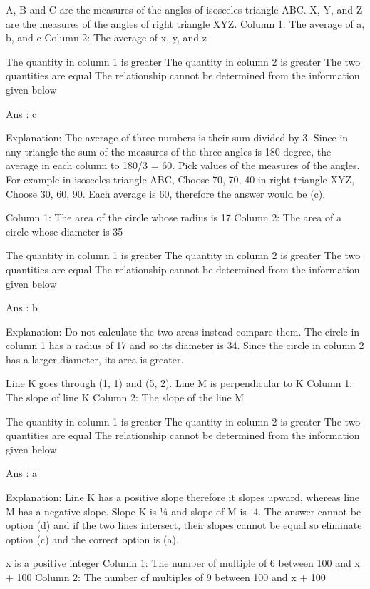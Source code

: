     A, B and C are the measures of the angles of isosceles triangle ABC. X, Y, and Z are the measures of the angles of right triangle XYZ.
    Column 1: The average of a, b, and c
    Column 2: The average of x, y, and z

        The quantity in column 1 is greater
        The quantity in column 2 is greater
        The two quantities are equal
        The relationship cannot be determined from the information given below 

    Ans : c

    Explanation:
    The average of three numbers is their sum divided by 3. Since in any triangle the sum of the measures of the three angles is 180 degree, the average in each column to 180/3 = 60. Pick values of the measures of the angles. For example in isosceles triangle ABC, Choose 70, 70, 40 in right triangle XYZ, Choose 30, 60, 90. Each average is 60, therefore the answer would be (c).

    Column 1: The area of the circle whose radius is 17
    Column 2: The area of a circle whose diameter is 35

        The quantity in column 1 is greater
        The quantity in column 2 is greater
        The two quantities are equal
        The relationship cannot be determined from the information given below 

    Ans : b

    Explanation:
    Do not calculate the two areas instead compare them. The circle in column 1 has a radius of 17 and so its diameter is 34. Since the circle in column 2 has a larger diameter, its area is greater.

    Line K goes through (1, 1) and (5, 2). Line M is perpendicular to K
    Column 1: The slope of line K
    Column 2: The slope of the line M

        The quantity in column 1 is greater
        The quantity in column 2 is greater
        The two quantities are equal
        The relationship cannot be determined from the information given below 

    Ans : a

    Explanation:
    Line K has a positive slope therefore it slopes upward, whereas line M has a negative slope. Slope K is ¼ and slope of M is -4. The answer cannot be option (d) and if the two lines intersect, their slopes cannot be equal so eliminate option (c) and the correct option is (a).

    x is a positive integer
    Column 1: The number of multiple of 6 between 100 and x + 100
    Column 2: The number of multiples of 9 between 100 and x + 100

